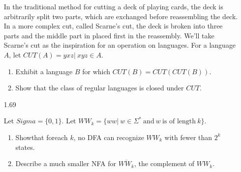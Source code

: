 \begin{enumerate}
            In the traditional method for cutting a deck of playing cards, the deck is arbitrarily split two parts, which are exchanged before reassembling the deck. In a more complex cut, called Scarne’s cut, the deck is broken into three parts and the middle part in placed first in the reassembly. We’ll take Scarne’s cut as the inspiration for an operation on languages.
            For a language $A$, let $CUT(A)={yxz|~xyz \in A}$.
            \begin{enumerate}
                  \item Exhibit a language $B$ for which $CUT(B)= CUT(CUT(B))$.
                  \item Show that the class of regular languages is closed under $CUT$.
            \end{enumerate}


      \item [1.69]

            Let $Sigma=\{0,1\}$. Let $WW_k = \{ww|~ w \in \Sigma^\ast~ \text{and}~ w~ \text{is of length}~ k\}$.
            \begin{enumerate}
                  \item Showthat foreach $k$, no DFA can recognize $WW_k$ with fewer than $2^k$ states.
                  \item Describe a much smaller NFA for $\overline{WW_k}$, the complement of $WW_k$.
            \end{enumerate}

\end{enumerate}
